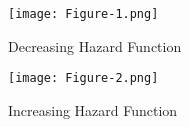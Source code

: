 \documentclass[journal,12pt,twocolumn]{IEEEtran}
\begin{document}
\vspace{0.5cm}\centering {}

\iffalse
\begin{figure}[h!]
    \texttt{[image: Figure-1.png]}
    \texttt{[image: Figure-2.png]}
\end{figure}
\fi
\begin{figure}[h]
    \centering
    \texttt{[image: Figure-1.png]}
    \caption{Decreasing Hazard Function}
    \label{fig:my_label1}
\end{figure}
\begin{figure}[h]
    \centering
    \texttt{[image: Figure-2.png]}
    \caption{Increasing Hazard Function}
    \label{fig:my_label2}
\end{figure}
\end{document}
